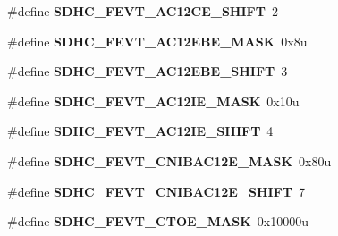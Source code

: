 \begin{DoxyCompactItemize}
\item 
\#define {\bfseries S\+D\+H\+C\+\_\+\+F\+E\+V\+T\+\_\+\+A\+C12\+C\+E\+\_\+\+S\+H\+I\+FT}~2\hypertarget{group__SDHC__Register__Masks_ga6765ca9b4ffb1bf49aa914593c6d6476}{}\label{group__SDHC__Register__Masks_ga6765ca9b4ffb1bf49aa914593c6d6476}

\item 
\#define {\bfseries S\+D\+H\+C\+\_\+\+F\+E\+V\+T\+\_\+\+A\+C12\+E\+B\+E\+\_\+\+M\+A\+SK}~0x8u\hypertarget{group__SDHC__Register__Masks_gaf9bf81ce7359d8baeaa6da8d311a17df}{}\label{group__SDHC__Register__Masks_gaf9bf81ce7359d8baeaa6da8d311a17df}

\item 
\#define {\bfseries S\+D\+H\+C\+\_\+\+F\+E\+V\+T\+\_\+\+A\+C12\+E\+B\+E\+\_\+\+S\+H\+I\+FT}~3\hypertarget{group__SDHC__Register__Masks_gad04d7f7589f8abb9ec05a978c7ec2ea9}{}\label{group__SDHC__Register__Masks_gad04d7f7589f8abb9ec05a978c7ec2ea9}

\item 
\#define {\bfseries S\+D\+H\+C\+\_\+\+F\+E\+V\+T\+\_\+\+A\+C12\+I\+E\+\_\+\+M\+A\+SK}~0x10u\hypertarget{group__SDHC__Register__Masks_gae0fbba676b66b6816ebf1a406cde14e2}{}\label{group__SDHC__Register__Masks_gae0fbba676b66b6816ebf1a406cde14e2}

\item 
\#define {\bfseries S\+D\+H\+C\+\_\+\+F\+E\+V\+T\+\_\+\+A\+C12\+I\+E\+\_\+\+S\+H\+I\+FT}~4\hypertarget{group__SDHC__Register__Masks_gaeb6a120837319438325080701d73318b}{}\label{group__SDHC__Register__Masks_gaeb6a120837319438325080701d73318b}

\item 
\#define {\bfseries S\+D\+H\+C\+\_\+\+F\+E\+V\+T\+\_\+\+C\+N\+I\+B\+A\+C12\+E\+\_\+\+M\+A\+SK}~0x80u\hypertarget{group__SDHC__Register__Masks_gab66c71256369c4a831fc9638fea7b8d1}{}\label{group__SDHC__Register__Masks_gab66c71256369c4a831fc9638fea7b8d1}

\item 
\#define {\bfseries S\+D\+H\+C\+\_\+\+F\+E\+V\+T\+\_\+\+C\+N\+I\+B\+A\+C12\+E\+\_\+\+S\+H\+I\+FT}~7\hypertarget{group__SDHC__Register__Masks_ga957c710cf39c6135c058ed28b24a73e0}{}\label{group__SDHC__Register__Masks_ga957c710cf39c6135c058ed28b24a73e0}

\item 
\#define {\bfseries S\+D\+H\+C\+\_\+\+F\+E\+V\+T\+\_\+\+C\+T\+O\+E\+\_\+\+M\+A\+SK}~0x10000u\hypertarget{group__SDHC__Register__Masks_ga5ecd45d4cd669e887f5cef39e6a8f508}{}\label{group__SDHC__Register__Masks_ga5ecd45d4cd669e887f5cef39e6a8f508}


\end{DoxyCompactItemize}

